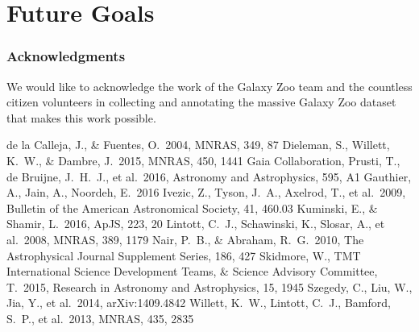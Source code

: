 \documentclass{article}
\begin{document}
\section{Future Goals}


\subsubsection*{Acknowledgments}

We would like to acknowledge the work of the Galaxy Zoo team and the countless citizen volunteers in collecting and annotating the massive Galaxy Zoo dataset that makes this work possible. 


\begin{thebibliography}{9}
 de la Calleja, J., \& Fuentes, O.\ 2004, MNRAS, 349, 87 
 Dieleman, S., Willett, K.~W., \& Dambre, J.\ 2015, MNRAS, 450, 1441
 Gaia Collaboration, Prusti, T., de Bruijne, J.~H.~J., et al.\ 2016, Astronomy and Astrophysics, 595, A1  
 Gauthier, A., Jain, A., Noordeh, E.\ 2016
 Ivezic, Z., Tyson, J.~A., Axelrod, T., et al.\ 2009, Bulletin of the American Astronomical Society, 41, 460.03 
 Kuminski, E., \& Shamir, L.\ 2016, ApJS, 223, 20 
 Lintott, C.~J., Schawinski, K., Slosar, A., et al.\ 2008, MNRAS, 389, 1179
 Nair, P.~B., \& Abraham, R.~G.\ 2010, The Astrophysical Journal Supplement Series, 186, 427 
 Skidmore, W., TMT International Science Development Teams, \& Science Advisory Committee, T.\ 2015, Research in Astronomy and Astrophysics, 15, 1945 
 Szegedy, C., Liu, W., Jia, Y., et al.\ 2014, arXiv:1409.4842 
 Willett, K.~W., Lintott, C.~J., Bamford, S.~P., et al.\ 2013, MNRAS, 435, 2835  
\end{thebibliography}
\end{document}
